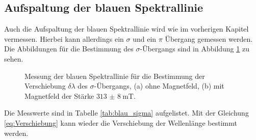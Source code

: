 \subsection{Aufspaltung der blauen Spektrallinie}
Auch die Aufspaltung der blauen Spektrallinie wird wie im vorherigen Kapitel vermessen.
Hierbei kann allerdings ein $\sigma$ und ein $\pi$ Übergang gemessen werden.
Die Abbildungen für die Bestimmung des $\sigma$-Übergangs sind in Abbildung \ref{fig:blau_sigma} zu sehen.
\FloatBarrier
\begin{figure}
    \centering
    \vspace{0.1\textwidth}
    \caption{Messung der blauen Spektrallinie für die Bestimmung der Verschiebung $\delta \lambda$ des $\sigma$-Übergangs, (a) ohne Magnetfeld, (b) mit Magnetfeld der Stärke $\SI{313(8)}{\milli\tesla}$.}
    \label{fig:blau_sigma}
\end{figure}
\FloatBarrier
Die Messwerte sind in Tabelle \ref{tab:blau_sigma} aufgelistet. Mit der Gleichung \eqref{eq:Verschiebung} kann wieder
die Verschiebung der Wellenlänge bestimmt werden.
\FloatBarrier
